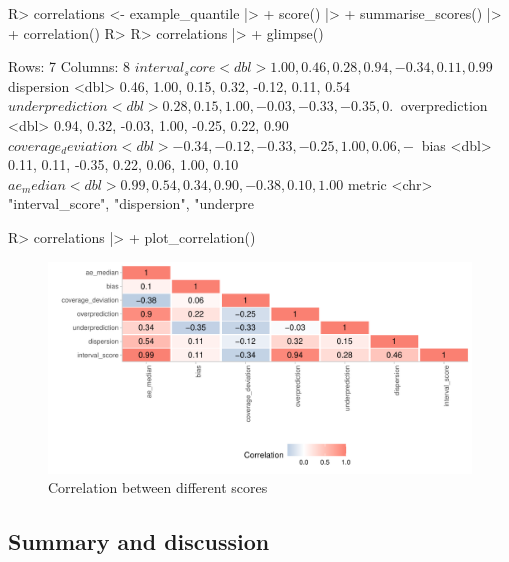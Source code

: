 \documentclass[
]{jss}
\begin{document}
\begin{CodeChunk}
\begin{CodeInput}
R> correlations <- example_quantile |>
+   score() |>
+   summarise_scores() |>
+   correlation() 
R> 
R> correlations |>
+   glimpse()
\end{CodeInput}
\begin{CodeOutput}
Rows: 7
Columns: 8
$ interval_score     <dbl> 1.00, 0.46, 0.28, 0.94, -0.34, 0.11, 0.99
$ dispersion         <dbl> 0.46, 1.00, 0.15, 0.32, -0.12, 0.11, 0.54
$ underprediction    <dbl> 0.28, 0.15, 1.00, -0.03, -0.33, -0.35, 0.~
$ overprediction     <dbl> 0.94, 0.32, -0.03, 1.00, -0.25, 0.22, 0.90
$ coverage_deviation <dbl> -0.34, -0.12, -0.33, -0.25, 1.00, 0.06, -~
$ bias               <dbl> 0.11, 0.11, -0.35, 0.22, 0.06, 1.00, 0.10
$ ae_median          <dbl> 0.99, 0.54, 0.34, 0.90, -0.38, 0.10, 1.00
$ metric             <chr> "interval_score", "dispersion", "underpre~
\end{CodeOutput}
\begin{CodeInput}
R> correlations |>
+   plot_correlation()
\end{CodeInput}
\begin{figure}[!h]

{\centering \includegraphics[width=1\linewidth]{manuscript_files/figure-latex/correlation-plot-1} 

}

\caption[Correlation between different scores]{Correlation between different scores}\label{fig:correlation-plot}
\end{figure}
\end{CodeChunk}

\hypertarget{summary-and-discussion}{%
\subsection{Summary and discussion}\label{summary-and-discussion}}
\end{document}

